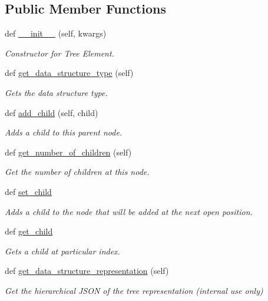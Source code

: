 \subsection*{Public Member Functions}
\begin{DoxyCompactItemize}
\item 
def \hyperlink{classbridges_1_1tree__element_1_1_tree_element_a37f9f119e4a1c0ff01b30bbb2f505a97}{\+\_\+\+\_\+init\+\_\+\+\_\+} (self, kwargs)
\begin{DoxyCompactList}\small\item\em Constructor for Tree Element. \end{DoxyCompactList}\item 
def \hyperlink{classbridges_1_1tree__element_1_1_tree_element_aeefaf309c1271b2e7272cf63be496457}{get\+\_\+data\+\_\+structure\+\_\+type} (self)
\begin{DoxyCompactList}\small\item\em Gets the data structure type. \end{DoxyCompactList}\item 
def \hyperlink{classbridges_1_1tree__element_1_1_tree_element_a7a5933a3de19a896712389dda41a4452}{add\+\_\+child} (self, child)
\begin{DoxyCompactList}\small\item\em Adds a child to this parent node. \end{DoxyCompactList}\item 
def \hyperlink{classbridges_1_1tree__element_1_1_tree_element_a5d0c6335324d675a6c0329dad72fca4d}{get\+\_\+number\+\_\+of\+\_\+children} (self)
\begin{DoxyCompactList}\small\item\em Get the number of children at this node. \end{DoxyCompactList}\item 
def \hyperlink{classbridges_1_1tree__element_1_1_tree_element_adb855562b31567f39e41e312f87ab98b}{set\+\_\+child}
\begin{DoxyCompactList}\small\item\em Adds a child to the node that will be added at the next open position. \end{DoxyCompactList}\item 
def \hyperlink{classbridges_1_1tree__element_1_1_tree_element_a137df45ceccca2cf489ea6df5719400e}{get\+\_\+child}
\begin{DoxyCompactList}\small\item\em Gets a child at particular index. \end{DoxyCompactList}\item 
def \hyperlink{classbridges_1_1tree__element_1_1_tree_element_ac578f7744d2553c91962b01b57b0e783}{get\+\_\+data\+\_\+structure\+\_\+representation} (self)
\begin{DoxyCompactList}\small\item\em Get the hierarchical J\+S\+ON of the tree representation (internal use only) \end{DoxyCompactList}\end{DoxyCompactItemize}
